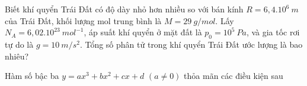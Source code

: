 \begin{vd}
	Biết khí quyển Trái Đất có độ dày nhỏ hơn nhiều so với bán kính $R = 6,4.10^6 \ m$ của Trái Đất, khối lượng mol trung bình là $M = 29 \ g/mol$. Lấy $N_A = 6,02.10^{23} \ mol^{-1}$, áp suất khí quyển ở mặt đất là $p_0 = 10^5 \ Pa$, và gia tốc rơi tự do là $g = 10 \ m/s^2$. Tổng số phân tử trong khí quyển Trái Đất ước lượng là bao nhiêu?
	
\end{vd}

\begin{vd}
	Hàm số bậc ba $y = ax^{3} + bx^{2} + cx +d$ $(a \neq 0)$ thỏa mãn các điều kiện sau
\end{vd}